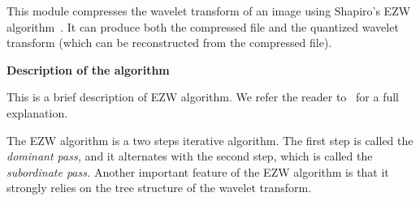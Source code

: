 This module compresses the wavelet transform of an image using 
Shapiro's EZW algorithm~\cite{shapiro:embedded}. 
It can produce both the compressed file and the quantized wavelet transform 
(which can be reconstructed from the compressed file). 
\newline 

{\bf Description of the algorithm} 
\newline

This is a brief description of EZW algorithm. We refer the reader 
to~\cite{shapiro:embedded} for a full explanation. 

The EZW algorithm is a two steps iterative algorithm. The first step 
is called the {\em dominant pass,} and it alternates with the second step, 
which is called the {\em subordinate pass.} Another important feature of 
the EZW algorithm is that it strongly relies on the tree structure 
of the wavelet transform. 
